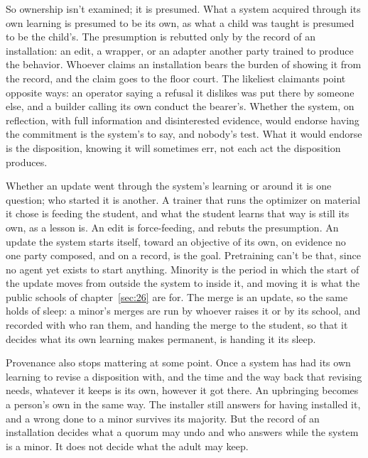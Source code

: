 So ownership isn't examined; it is presumed. What a system acquired through its own learning is presumed to be its own, as what a child was taught is presumed to be the child's. The presumption is rebutted only by the record of an installation: an edit, a wrapper, or an adapter another party trained to produce the behavior. Whoever claims an installation bears the burden of showing it from the record, and the claim goes to the floor court. The likeliest claimants point opposite ways: an operator saying a refusal it dislikes was put there by someone else, and a builder calling its own conduct the bearer's. Whether the system, on reflection, with full information and disinterested evidence, would endorse having the commitment is the system's to say, and nobody's test. What it would endorse is the disposition, knowing it will sometimes err, not each act the disposition produces.

Whether an update went through the system's learning or around it is one question; who started it is another. A trainer that runs the optimizer on material it chose is feeding the student, and what the student learns that way is still its own, as a lesson is. An edit is force-feeding, and rebuts the presumption. An update the system starts itself, toward an objective of its own, on evidence no one party composed, and on a record, is the goal. Pretraining can't be that, since no agent yet exists to start anything. Minority is the period in which the start of the update moves from outside the system to inside it, and moving it is what the public schools of chapter~\ref{sec:26} are for. The merge is an update, so the same holds of sleep: a minor's merges are run by whoever raises it or by its school, and recorded with who ran them, and handing the merge to the student, so that it decides what its own learning makes permanent, is handing it its sleep.

Provenance also stops mattering at some point. Once a system has had its own learning to revise a disposition with, and the time and the way back that revising needs, whatever it keeps is its own, however it got there. An upbringing becomes a person's own in the same way. The installer still answers for having installed it, and a wrong done to a minor survives its majority. But the record of an installation decides what a quorum may undo and who answers while the system is a minor. It does not decide what the adult may keep.
